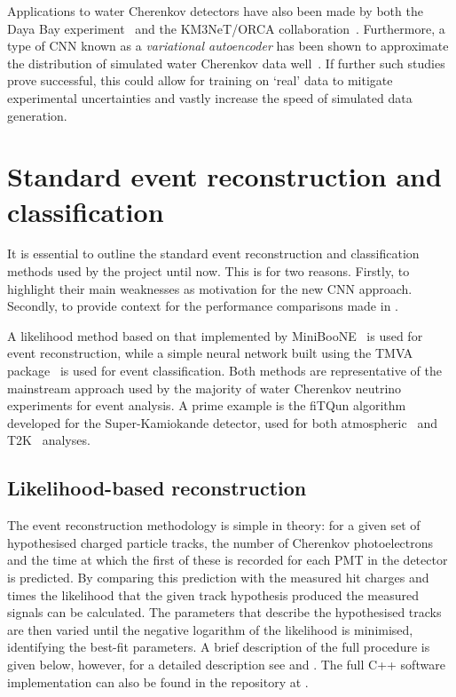 Applications to water Cherenkov detectors have also been made by both the Daya Bay
experiment~\cite{racah2016} and the KM3NeT/ORCA collaboration~\cite{aiello2020}. Furthermore, a
type of CNN known as a \emph{variational autoencoder} has been shown to approximate the
distribution of simulated water Cherenkov data well~\cite{abhishek2019}. If further such studies
prove successful, this could allow for training on `real' data to mitigate experimental
uncertainties and vastly increase the speed of simulated data generation.

\section{Standard event reconstruction and classification} %
\label{sec:cnn_old} %

It is essential to outline the standard event reconstruction and classification methods used by
the \chips project until now. This is for two reasons. Firstly, to highlight their main weaknesses
as motivation for the new CNN approach. Secondly, to provide context for the performance
comparisons made in .

A likelihood method based on that implemented by MiniBooNE~\cite{patterson2009} is used for event
reconstruction, while a simple neural network built using the TMVA package~\cite{hocker2007} is
used for event classification. Both methods are representative of the mainstream approach used by
the majority of water Cherenkov neutrino experiments for event analysis. A prime example is the
fiTQun algorithm developed for the Super-Kamiokande detector, used for both
atmospheric~\cite{jiang2019} and T2K~\cite{missert2017} analyses.

\subsection{Likelihood-based reconstruction} %
\label{sec:cnn_old_reco} %

The event reconstruction methodology is simple in theory: for a given set of hypothesised charged
particle tracks, the number of Cherenkov photoelectrons and the time at which the first of these
is recorded for each PMT in the detector is predicted. By comparing this prediction with the
measured hit charges and times the likelihood that the given track hypothesis produced the
measured signals can be calculated. The parameters that describe the hypothesised tracks are then
varied until the negative logarithm of the likelihood is minimised, identifying the best-fit
parameters. A brief description of the full procedure is given below, however, for a detailed
description see  and . The full C++ software
implementation can also be found in the repository at .

